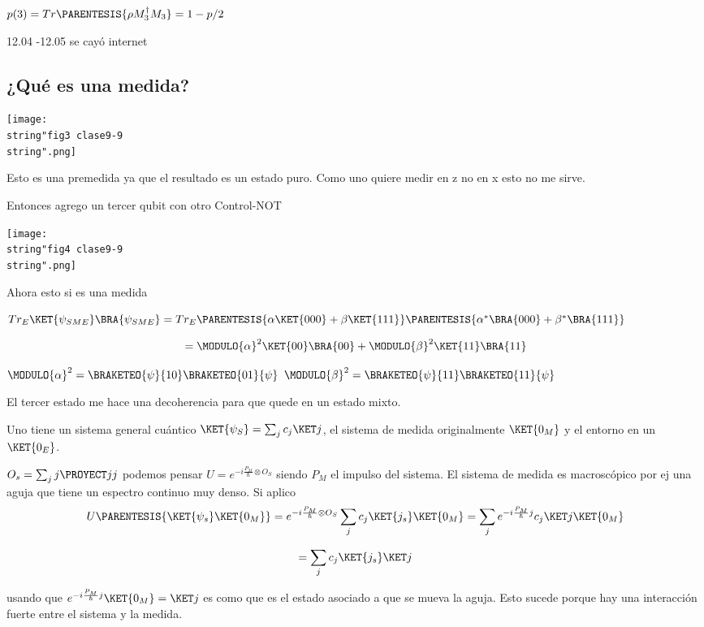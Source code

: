$p(3)=Tr\PARENTESIS{\rho M_{3}^{\dagger}M_{3}}=1-p/2$

12.04 -12.05 se cayó internet

\subsection{¿Qué es una medida?}
\begin{center}
\texttt{[image: \\string"fig3 clase9-9\\string".png]}
\par\end{center}

Esto es una premedida ya que el resultado es un estado puro. Como
uno quiere medir en z no en x esto no me sirve.

Entonces agrego un tercer qubit con otro Control-NOT
\begin{center}
\texttt{[image: \\string"fig4 clase9-9\\string".png]}
\par\end{center}

Ahora esto si es una medida

$Tr_{E}\KET{\psi_{SME}}\BRA{\psi_{SME}}=Tr_{E}\PARENTESIS{\alpha\KET{000}+\beta\KET{111}}\PARENTESIS{\alpha^{*}\BRA{000}+\beta^{*}\BRA{111}}$

\[
=\MODULO{\alpha}^{2}\KET{00}\BRA{00}+\MODULO{\beta}^{2}\KET{11}\BRA{11}
\]

$\MODULO{\alpha}^{2}=\BRAKETEO{\psi}{10}\BRAKETEO{01}{\psi}$ $\MODULO{\beta}^{2}=\BRAKETEO{\psi}{11}\BRAKETEO{11}{\psi}$

El tercer estado me hace una decoherencia para que quede en un estado
mixto.

Uno tiene un sistema general cuántico $\KET{\psi_{S}}=\sum_{j}c_{j}\KET j$,
el sistema de medida originalmente $\KET{0_{M}}$ y el entorno en
un $\KET{0_{E}}$. 

$O_{s}=\sum_{j}j\PROYECT jj$ podemos pensar $U=e^{-i\frac{P_{M}}{\hbar}\otimes O_{S}}$
siendo $P_{M}$ el impulso del sistema. El sistema de medida es macroscópico
por ej una aguja que tiene un espectro continuo muy denso. Si aplico
\[
U\PARENTESIS{\KET{\psi_{s}}\KET{0_{M}}}=e^{-i\frac{P_{M}}{\hbar}\otimes O_{S}}\sum_{j}c_{j}\KET{j_{s}}\KET{0_{M}}=\sum_{j}e^{-i\frac{P_{M}}{\hbar}j}c_{j}\KET j\KET{0_{M}}
\]

\[
=\sum_{j}c_{j}\KET{j_{s}}\KET j
\]

usando que $e^{-i\frac{P_{M}}{\hbar}j}\KET{0_{M}}=\KET j$ es como
que es el estado asociado a que se mueva la aguja. Esto sucede porque
hay una interacción fuerte entre el sistema y la medida.


